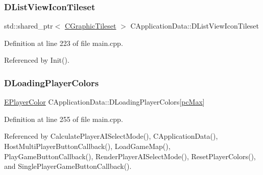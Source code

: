 \hypertarget{classCApplicationData_ab00db57ca7c624d026ed1fc108bc5b38}{}\label{classCApplicationData_ab00db57ca7c624d026ed1fc108bc5b38} 
\subsubsection{\texorpdfstring{D\+List\+View\+Icon\+Tileset}{DListViewIconTileset}}
{\footnotesize\ttfamily std\+::shared\+\_\+ptr$<$ \hyperlink{classCGraphicTileset}{C\+Graphic\+Tileset} $>$ C\+Application\+Data\+::\+D\+List\+View\+Icon\+Tileset\hspace{0.3cm}{\ttfamily [protected]}}



Definition at line 223 of file main.\+cpp.



Referenced by Init().

\hypertarget{classCApplicationData_ab29b80d90f1201608dcb498cd627a6f9}{}\label{classCApplicationData_ab29b80d90f1201608dcb498cd627a6f9} 
\subsubsection{\texorpdfstring{D\+Loading\+Player\+Colors}{DLoadingPlayerColors}}
{\footnotesize\ttfamily \hyperlink{GameDataTypes_8h_aafb0ca75933357ff28a6d7efbdd7602f}{E\+Player\+Color} C\+Application\+Data\+::\+D\+Loading\+Player\+Colors\mbox{[}\hyperlink{GameDataTypes_8h_aafb0ca75933357ff28a6d7efbdd7602fa594a5c8dd3987f24e8a0f23f1a72cd34}{pc\+Max}\mbox{]}\hspace{0.3cm}{\ttfamily [protected]}}



Definition at line 255 of file main.\+cpp.



Referenced by Calculate\+Player\+A\+I\+Select\+Mode(), C\+Application\+Data(), Host\+Multi\+Player\+Button\+Callback(), Load\+Game\+Map(), Play\+Game\+Button\+Callback(), Render\+Player\+A\+I\+Select\+Mode(), Reset\+Player\+Colors(), and Single\+Player\+Game\+Button\+Callback().

\hypertarget{classCApplicationData_a2ac5711b027842d57aa5f8e5a7adc589}{}\label{classCApplicationData_a2ac5711b027842d57aa5f8e5a7adc589} 
